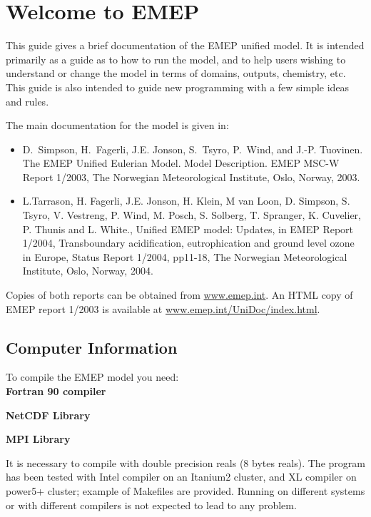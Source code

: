 \chapter{Welcome to EMEP }

This guide gives a brief documentation of the EMEP unified model.
It is intended primarily as a guide as to how to run the model, and
to help users wishing to understand or change 
the model in terms of domains, outputs, chemistry, etc.
This guide is also intended to guide new programming with a few
simple ideas and rules.

The main documentation for the model is given in:

\begin{itemize}
\item
D.~Simpson, H.~Fagerli, J.E. Jonson, S.~Tsyro, P.~Wind, and J.-P. Tuovinen.
{The EMEP Unified Eulerian Model. Model Description}.
EMEP MSC-W Report 1/2003, The Norwegian
Meteorological Institute, Oslo, Norway, 2003.
\item
L.Tarrason, H. Fagerli, J.E. Jonson, H. Klein, M van Loon, D. Simpson,
        S. Tsyro, V. Vestreng, P. Wind, M. Posch, S. Solberg, T. Spranger,
        K. Cuvelier, P. Thunis and L. White., Unified EMEP model: Updates,
        in EMEP Report 1/2004, Transboundary acidification, eutrophication
        and ground level ozone in Europe, Status Report 1/2004, pp11-18, The
        Norwegian Meteorological Institute, Oslo, Norway, 2004. 

\end{itemize}

Copies of both reports can be obtained from \url{www.emep.int}. An HTML
copy of EMEP report 1/2003 is available at \url{www.emep.int/UniDoc/index.html}.


\section{Computer Information}

To compile the EMEP model you need:\\

\textbf{Fortran 90 compiler}

\textbf{NetCDF Library}

\textbf{MPI Library}

It is necessary to compile with double precision reals (8 bytes
reals).  The program has been tested with Intel compiler on an
Itanium2 cluster, and XL compiler on power5+ cluster; example of
Makefiles are provided. Running on different systems or with different
compilers is not expected to lead to any problem.

